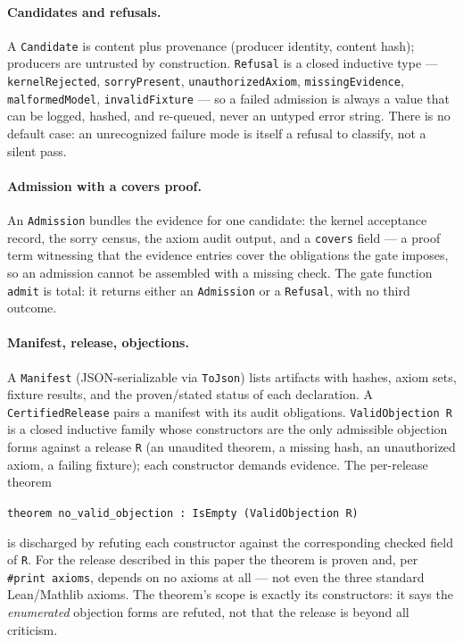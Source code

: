 \documentclass[11pt]{article}
\begin{document}
\paragraph{Candidates and refusals.}
A \texttt{Candidate} is content plus provenance (producer identity, content
hash); producers are untrusted by construction. \texttt{Refusal} is a closed
inductive type --- \texttt{kernelRejected}, \texttt{sorryPresent},
\texttt{unauthorizedAxiom}, \texttt{missingEvidence},
\texttt{malformedModel}, \texttt{invalidFixture} --- so a failed admission is
always a value that can be logged, hashed, and re-queued, never an untyped
error string. There is no default case: an unrecognized failure mode is
itself a refusal to classify, not a silent pass.

\paragraph{Admission with a covers proof.}
An \texttt{Admission} bundles the evidence for one candidate: the kernel
acceptance record, the sorry census, the axiom audit output, and a
\texttt{covers} field --- a proof term witnessing that the evidence entries
cover the obligations the gate imposes, so an admission cannot be assembled
with a missing check. The gate function \texttt{admit} is total: it returns
either an \texttt{Admission} or a \texttt{Refusal}, with no third outcome.

\paragraph{Manifest, release, objections.}
A \texttt{Manifest} (JSON-serializable via \texttt{ToJson}) lists artifacts
with hashes, axiom sets, fixture results, and the proven/stated status of
each declaration. A \texttt{CertifiedRelease} pairs a manifest with its
audit obligations. \texttt{ValidObjection R} is a closed inductive family
whose constructors are the only admissible objection forms against a
release \texttt{R} (an unaudited theorem, a missing hash, an unauthorized
axiom, a failing fixture); each constructor demands evidence. The
per-release theorem
\begin{center}
\texttt{theorem no\_valid\_objection : IsEmpty (ValidObjection R)}
\end{center}
is discharged by refuting each constructor against the corresponding checked
field of \texttt{R}. For the release described in this paper the theorem is
proven and, per \texttt{\#print axioms}, depends on no axioms at all --- not
even the three standard Lean/Mathlib axioms. The theorem's scope is exactly
its constructors: it says the \emph{enumerated} objection forms are refuted,
not that the release is beyond all criticism.
\end{document}
